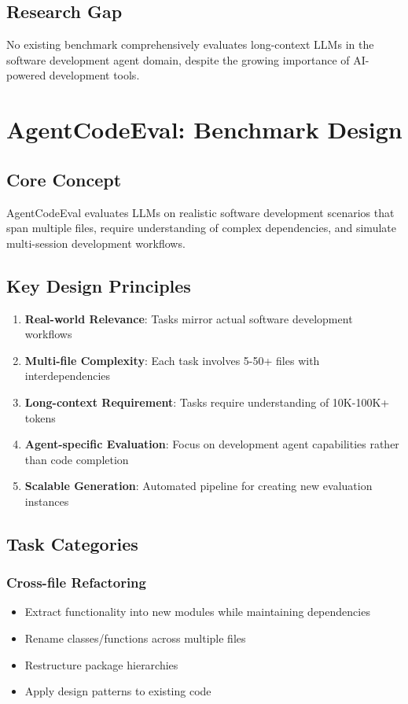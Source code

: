 \documentclass{article}
\begin{document}
\subsection{Research Gap}
No existing benchmark comprehensively evaluates long-context LLMs in the software development agent domain, despite the growing importance of AI-powered development tools.

\section{AgentCodeEval: Benchmark Design}

\subsection{Core Concept}
AgentCodeEval evaluates LLMs on realistic software development scenarios that span multiple files, require understanding of complex dependencies, and simulate multi-session development workflows.

\subsection{Key Design Principles}
\begin{enumerate}
    \item \textbf{Real-world Relevance}: Tasks mirror actual software development workflows
    \item \textbf{Multi-file Complexity}: Each task involves 5-50+ files with interdependencies
    \item \textbf{Long-context Requirement}: Tasks require understanding of 10K-100K+ tokens
    \item \textbf{Agent-specific Evaluation}: Focus on development agent capabilities rather than code completion
    \item \textbf{Scalable Generation}: Automated pipeline for creating new evaluation instances
\end{enumerate}

\subsection{Task Categories}

\subsubsection{Cross-file Refactoring}
\begin{itemize}
    \item Extract functionality into new modules while maintaining dependencies
    \item Rename classes/functions across multiple files
    \item Restructure package hierarchies
    \item Apply design patterns to existing code
\end{itemize}
\end{document}
